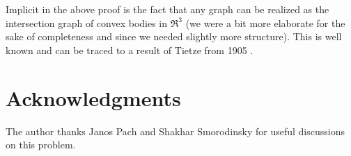 \documentclass[12pt]{article}
\begin{document}
Implicit in the above proof is the fact that any graph can be realized
as the intersection graph of convex bodies in $\Re^3$ (we were a bit
more elaborate for the sake of completeness and since we needed
slightly more structure). This is well known and can be traced to a
result of Tietze from 1905 \cite{t-upnr-05}.







\section*{Acknowledgments}

The author thanks Janos Pach and Shakhar Smorodinsky for useful
discussions on this problem.




 

\end{document}
